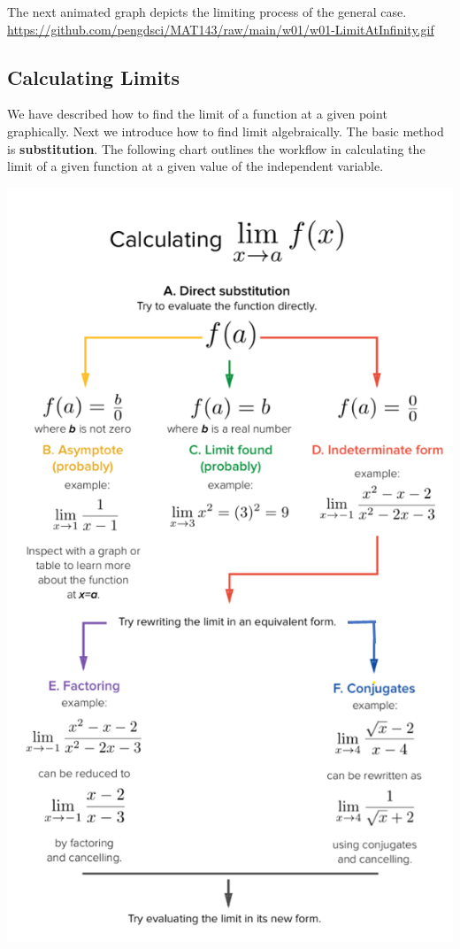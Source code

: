 \documentclass[
]{book}
\begin{document}
\hfill\break

The next animated graph depicts the limiting process of the general case.
\url{https://github.com/pengdsci/MAT143/raw/main/w01/w01-LimitAtInfinity.gif}

\hypertarget{calculating-limits}{%
\subsection{Calculating Limits}\label{calculating-limits}}

We have described how to find the limit of a function at a given point graphically. Next we introduce how to find limit algebraically. The basic method is \textbf{substitution}. The following chart outlines the workflow in calculating the limit of a given function at a given value of the independent variable.

\begin{center}\includegraphics[width=0.75\linewidth]{img01/w01-CalculateLimit} \end{center}
\end{document}
